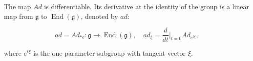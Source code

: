 The map $Ad$ is differentiable. Its derivative at the identity of the group is a linear map from $\mathfrak{g}$ to $\operatorname{End}(\mathfrak{g})$, denoted by $ad$:

$$ad = Ad_{*e} : \mathfrak{g} \to \operatorname{End}(\mathfrak{g}), \quad ad_\xi = \frac{d}{dt}\bigg|_{t=0} Ad_{e^{t\xi}},$$

where $e^{t\xi}$ is the one-parameter subgroup with tangent vector $\xi$.
